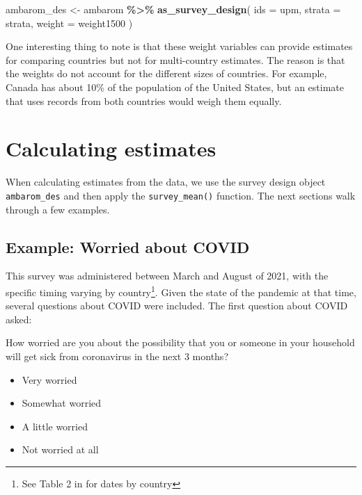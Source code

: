 \documentclass[
]{krantz}
\makeatletter
\newenvironment{Shaded}{\begin{snugshade}}{\end{snugshade}}
\newcommand{\AttributeTok}[1]{\textcolor[rgb]{0.27,0.27,0.27}{#1}}
\newcommand{\FunctionTok}[1]{\textcolor[rgb]{0.27,0.27,0.27}{\textbf{#1}}}
\newcommand{\NormalTok}[1]{#1}
\newcommand{\OtherTok}[1]{\textcolor[rgb]{0.37,0.37,0.37}{#1}}
\newcommand{\SpecialCharTok}[1]{\textcolor[rgb]{0.43,0.43,0.43}{\textbf{#1}}}
\providecommand{\tightlist}{%
  \setlength{\itemsep}{0pt}\setlength{\parskip}{0pt}}
\renewenvironment{quote}{\begin{VF}}{\end{VF}}
\newenvironment{kframe}{%
\medskip{}
\setlength{\fboxsep}{.8em}
 \def\at@end@of@kframe{}%
 \ifinner\ifhmode%
  \def\at@end@of@kframe{\end{minipage}}%
  \begin{minipage}{\columnwidth}%
 \fi\fi%
 \def\FrameCommand##1{\hskip\@totalleftmargin \hskip-\fboxsep
 \colorbox{shadecolor}{##1}\hskip-\fboxsep
     \hskip-\linewidth \hskip-\@totalleftmargin \hskip\columnwidth}%
 \MakeFramed {\advance\hsize-\width
   \@totalleftmargin\z@ \linewidth\hsize
   \@setminipage}}%
 {\par\unskip\endMakeFramed%
 \at@end@of@kframe}
\renewenvironment{Shaded}{\begin{kframe}}{\end{kframe}}
\makeatother
\begin{document}
\begin{Shaded}
\begin{Highlighting}[]
\NormalTok{ambarom\_des }\OtherTok{\textless{}{-}}\NormalTok{ ambarom }\SpecialCharTok{\%\textgreater{}\%}
  \FunctionTok{as\_survey\_design}\NormalTok{(}
    \AttributeTok{ids =}\NormalTok{ upm,}
    \AttributeTok{strata =}\NormalTok{ strata,}
    \AttributeTok{weight =}\NormalTok{ weight1500}
\NormalTok{  )}
\end{Highlighting}
\end{Shaded}

One interesting thing to note is that these weight variables can provide estimates for comparing countries but not for multi-country estimates. The reason is that the weights do not account for the different sizes of countries. For example, Canada has about 10\% of the population of the United States, but an estimate that uses records from both countries would weigh them equally.

\hypertarget{ambarom-estimates}{%
\section{Calculating estimates}\label{ambarom-estimates}}

When calculating estimates from the data, we use the survey design object \texttt{ambarom\_des} and then apply the \texttt{survey\_mean()} function. The next sections walk through a few examples.

\hypertarget{example-worried-about-covid}{%
\subsection{Example: Worried about COVID}\label{example-worried-about-covid}}

This survey was administered between March and August of 2021, with the specific timing varying by country\footnote{See Table 2 in \citet{lapop-tech} for dates by country}. Given the state of the pandemic at that time, several questions about COVID were included. The first question about COVID asked:

\begin{quote}
How worried are you about the possibility that you or someone in your household will get sick from coronavirus in the next 3 months?

\begin{itemize}
\tightlist
\item
  Very worried
\item
  Somewhat worried
\item
  A little worried
\item
  Not worried at all
\end{itemize}
\end{quote}
\end{document}
